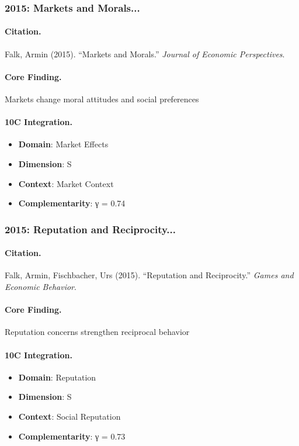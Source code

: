 \subsubsection{2015: Markets and Morals...}

\paragraph{Citation.}
Falk, Armin (2015). ``Markets and Morals.''
\textit{Journal of Economic Perspectives}.

\paragraph{Core Finding.}
Markets change moral attitudes and social preferences

\paragraph{10C Integration.}
\begin{itemize}[nosep]
  \item \textbf{Domain}: Market Effects
  \item \textbf{Dimension}: S
  \item \textbf{Context}: Market Context
  \item \textbf{Complementarity}: γ = 0.74
\end{itemize}


\subsubsection{2015: Reputation and Reciprocity...}

\paragraph{Citation.}
Falk, Armin, Fischbacher, Urs (2015). ``Reputation and Reciprocity.''
\textit{Games and Economic Behavior}.

\paragraph{Core Finding.}
Reputation concerns strengthen reciprocal behavior

\paragraph{10C Integration.}
\begin{itemize}[nosep]
  \item \textbf{Domain}: Reputation
  \item \textbf{Dimension}: S
  \item \textbf{Context}: Social Reputation
  \item \textbf{Complementarity}: γ = 0.73
\end{itemize}


